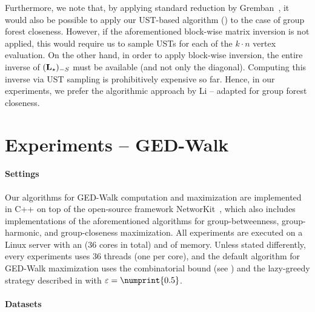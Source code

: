 Furthermore, we note that, by applying standard reduction by
Gremban~\cite{GrembanPHD}, it would also be possible to apply our UST-based
algorithm (\ie {}) to the case of group forest
closeness. However, if the aforementioned block-wise matrix inversion is not
applied, this would require us to sample USTs for each of the $k\cdot n$ vertex
evaluation.
On the other hand, in order to apply block-wise inversion, the entire inverse
of $(\mathbf{L_{\star}})_{-S}$ must be available (and not only the diagonal).
Computing this inverse via UST sampling is prohibitively expensive so far.
Hence, in our experiments, we prefer the algorithmic approach by Li \etal -- adapted
for group forest closeness.

\section{Experiments -- GED-Walk}
\label{sec:ged-walk:experiments}
%
%
\paragraph{Settings}
%
Our algorithms for GED-Walk computation and maximization are implemented in C++
on top of the open-source framework
NetworKit~\cite{DBLP:journals/netsci/StaudtSM16}, which also includes
implementations of the aforementioned algorithms for group-betweenness, group-harmonic,
and group-closeness maximization.
All experiments are executed on a Linux server with an \egocpu (36 cores
in total) and \egoram of memory.
Unless stated differently, every experiments uses 36 threads (one per core),
and the default algorithm for GED-Walk maximization uses the combinatorial
bound (see ) and the lazy-greedy
strategy described in  with $\epsilon =
\numprint{0.5}$.

\paragraph{Datasets}
%
\begin{table}
\centering\footnotesize
{}
\label{tab:ged-walk:real-world-insts}

\end{table}

